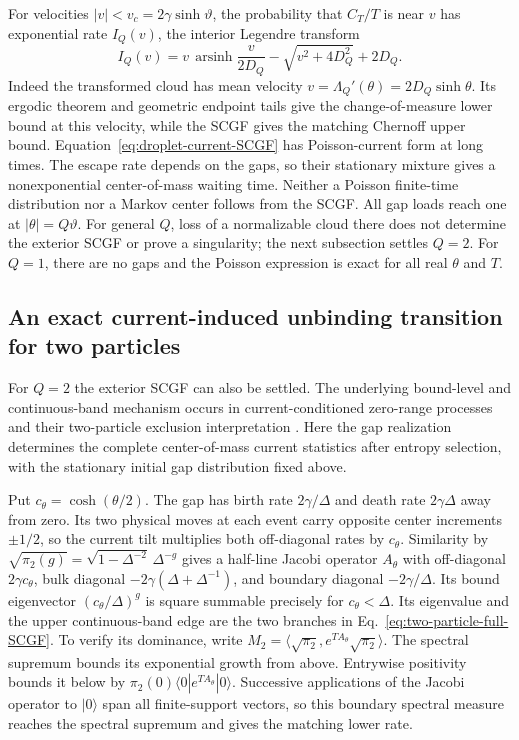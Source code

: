 \documentclass[aps,pre,reprint,amsmath,amssymb,longbibliography,floatfix]{revtex4-2}
\begin{document}
For velocities $|v|<v_c=2\gamma\sinh\vartheta$, the probability that $C_T/T$ is near $v$ has exponential rate
$I_Q(v)$, the interior Legendre transform
\begin{equation}
 I_Q(v)=v\,\operatorname{arsinh}\frac{v}{2D_Q}
       -\sqrt{v^2+4D_Q^2}+2D_Q .\label{eq:droplet-current-rate}
\end{equation}
Indeed the transformed cloud has mean velocity
$v=\Lambda_Q'(\theta)=2D_Q\sinh\theta$. Its ergodic theorem and
geometric endpoint tails give the change-of-measure lower bound at this
velocity, while the SCGF gives the matching Chernoff upper bound.
Equation~\eqref{eq:droplet-current-SCGF} has Poisson-current form at long
times. The escape rate depends on the gaps, so their stationary mixture
gives a nonexponential center-of-mass waiting time. Neither a Poisson
finite-time distribution nor a Markov center follows from the SCGF.
All gap loads reach one at $|\theta|=Q\vartheta$.
For general $Q$, loss of a normalizable cloud there does not determine
the exterior SCGF or prove a singularity; the next subsection settles
$Q=2$. For $Q=1$, there are
no gaps and the Poisson expression is exact for all real $\theta$ and $T$.

\subsection{An exact current-induced unbinding transition for two particles}
\label{app:two-particle-current}
For $Q=2$ the exterior SCGF can also be settled. The underlying
bound-level and continuous-band mechanism occurs in current-conditioned
zero-range processes and their two-particle exclusion interpretation
\cite{RakosHarris2008}. Here the gap realization determines the complete
center-of-mass current statistics after entropy selection, with the
stationary initial gap distribution fixed above.

Put $c_\theta=\cosh(\theta/2)$. The gap has birth rate $2\gamma/\Delta$
and death rate $2\gamma\Delta$ away from zero. Its two physical moves
at each event carry opposite center increments $\pm1/2$, so the current
tilt multiplies both off-diagonal rates by $c_\theta$. Similarity by
$\sqrt{\pi_2(g)}=\sqrt{1-\Delta^{-2}}\,\Delta^{-g}$ gives a half-line
Jacobi operator $A_\theta$ with off-diagonal $2\gamma c_\theta$, bulk
diagonal $-2\gamma(\Delta+\Delta^{-1})$, and boundary diagonal
$-2\gamma/\Delta$. Its bound eigenvector $(c_\theta/\Delta)^g$ is
square summable precisely for $c_\theta<\Delta$. Its eigenvalue
and the upper continuous-band edge are the two branches in
Eq.~\eqref{eq:two-particle-full-SCGF}. To verify its
dominance, write $M_2=\langle\sqrt{\pi_2},e^{TA_\theta}\sqrt{\pi_2}\rangle$.
The spectral supremum bounds its exponential growth from above.
Entrywise positivity bounds it below by
$\pi_2(0)\langle0|e^{TA_\theta}|0\rangle$.
Successive applications of the Jacobi operator to $|0\rangle$ span all
finite-support vectors, so this boundary spectral measure reaches the
spectral supremum and gives the matching lower rate.
\end{document}
